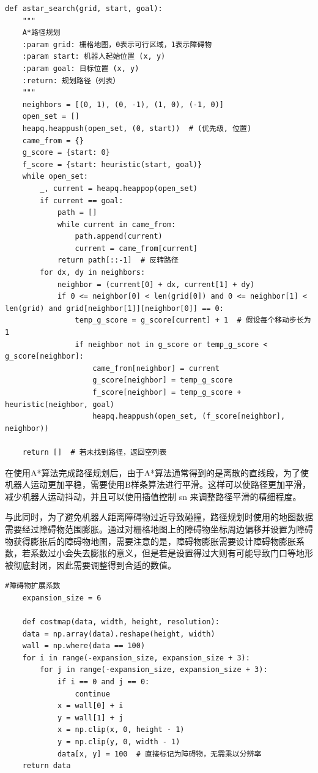 \begin{lstlisting}[caption={实现A*算法}]
    def astar_search(grid, start, goal):
    """
    A*路径规划
    :param grid: 栅格地图，0表示可行区域，1表示障碍物
    :param start: 机器人起始位置 (x, y)
    :param goal: 目标位置 (x, y)
    :return: 规划路径（列表）
    """
    neighbors = [(0, 1), (0, -1), (1, 0), (-1, 0)]
    open_set = []
    heapq.heappush(open_set, (0, start))  # (优先级, 位置)
    came_from = {}
    g_score = {start: 0}
    f_score = {start: heuristic(start, goal)}
    while open_set:
        _, current = heapq.heappop(open_set)
        if current == goal:
            path = []
            while current in came_from:
                path.append(current)
                current = came_from[current]
            return path[::-1]  # 反转路径
        for dx, dy in neighbors:
            neighbor = (current[0] + dx, current[1] + dy)
            if 0 <= neighbor[0] < len(grid[0]) and 0 <= neighbor[1] < len(grid) and grid[neighbor[1]][neighbor[0]] == 0:
                temp_g_score = g_score[current] + 1  # 假设每个移动步长为1
                if neighbor not in g_score or temp_g_score < g_score[neighbor]:
                    came_from[neighbor] = current
                    g_score[neighbor] = temp_g_score
                    f_score[neighbor] = temp_g_score + heuristic(neighbor, goal)
                    heapq.heappush(open_set, (f_score[neighbor], neighbor))

    return []  # 若未找到路径，返回空列表
\end{lstlisting}

在使用A*算法完成路径规划后，由于A*算法通常得到的是离散的直线段，为了使机器人运动更加平稳，需要使用B样条算法进行平滑。这样可以使路径更加平滑，减少机器人运动抖动，并且可以使用插值控制 sn 来调整路径平滑的精细程度。

与此同时，为了避免机器人距离障碍物过近导致碰撞，路径规划时使用的地图数据需要经过障碍物范围膨胀。通过对栅格地图上的障碍物坐标周边偏移并设置为障碍物获得膨胀后的障碍物地图，需要注意的是，障碍物膨胀需要设计障碍物膨胀系数，若系数过小会失去膨胀的意义，但是若是设置得过大则有可能导致门口等地形被彻底封闭，因此需要调整得到合适的数值。

\begin{lstlisting}[caption={障碍物膨胀方法}]
    #障碍物扩展系数
    expansion_size = 6 

    def costmap(data, width, height, resolution):
    data = np.array(data).reshape(height, width)
    wall = np.where(data == 100)
    for i in range(-expansion_size, expansion_size + 3):
        for j in range(-expansion_size, expansion_size + 3):
            if i == 0 and j == 0:
                continue
            x = wall[0] + i
            y = wall[1] + j
            x = np.clip(x, 0, height - 1)
            y = np.clip(y, 0, width - 1)
            data[x, y] = 100  # 直接标记为障碍物，无需乘以分辨率
    return data
\end{lstlisting}


